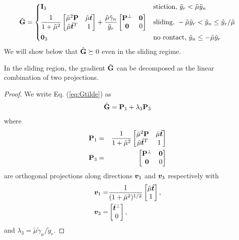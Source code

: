 \begin{equation}
	\sGtilde = 
	\begin{dcases}
		\mf{I}_3
		& \text{stiction, } \tilde{y}_r < \tilde{\mu} \tilde{y}_n\\
		\frac{1}{1+\tilde\mu^2}
		\begin{bmatrix}
			\tilde\mu^2\mf{P} & \tilde\mu\sthat\\
			\tilde\mu\sthat^T & 1
		\end{bmatrix} +
		\frac{\tilde\mu\tilde\gamma_n}{\tilde{y}_r}
		\begin{bmatrix}
			\mf{P}^\perp & \mf{0}\\
			\mf{0} & 0
		\end{bmatrix}
		& \text{sliding, } -\tilde\mu \tilde{y}_r < \tilde{y}_n \leq \tilde{y}_r/\tilde\mu\\
		\mf{0}_3 & \text{no contact, } \tilde{y}_n \leq -\tilde\mu\tilde{y}_r
	\end{dcases}
	\label{eq:Gtilde}
\end{equation}
We will show below that $\tilde{{\mathbf{G}}}\succeq 0$ even in the sliding regime.

\begin{lemma}
In the sliding region, the gradient $\tilde{{\mathbf{G}}}$ can be decomposed as the linear combination of two projections.
\end{lemma}
\begin{proof}
We write Eq. (\ref{eq:Gtilde}) as
	\begin{equation}
		\tilde{{\mathbf{G}}} = {\mathbf{P}}_1 + \lambda_3 {\mathbf{P}}_3
	\end{equation}	
	where
	\begin{eqnarray}
		{\mathbf{P}}_1 &=& 
		\frac{1}{1+\tilde\mu^2}
			\begin{bmatrix}
				\tilde\mu^2{\mathbf{P}} & \tilde\mu\hat{{\bm{t}}}\\
				\tilde\mu\hat{{\bm{t}}}^T & 1 \end{bmatrix}\\
		{\mathbf{P}}_3 &=& 		
			\begin{bmatrix}
				{\mathbf{P}}^\perp & {\mathbf{0}}\\
				{\mathbf{0}} & 0
			\end{bmatrix}
	\end{eqnarray}
are orthogonal projections along directions ${\bm{v}}_1$ and ${\bm{v}}_3$
respectively with
\begin{eqnarray}
	{\bm{v}}_1 =& \frac{1}{(1+\tilde\mu^2)^{1/2}}
	\begin{bmatrix}
		\tilde\mu\hat{{\bm{t}}}\\
		1
	\end{bmatrix},\\
	{\bm{v}}_3 =& 
	\begin{bmatrix}
		\hat{{\bm{t}}}^\perp\\
		0
	\end{bmatrix},
\end{eqnarray}
and $\lambda_3 = \tilde\mu\tilde\gamma_n/\tilde{y}_r$.
\end{proof}
		
